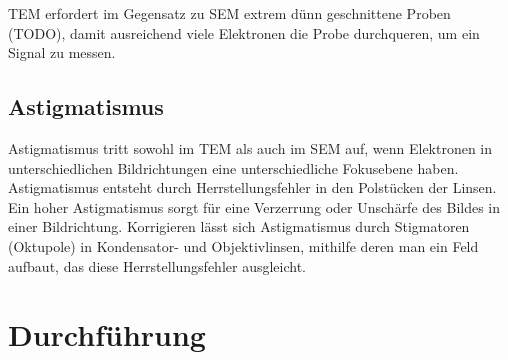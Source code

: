 TEM erfordert im Gegensatz zu SEM extrem dünn geschnittene Proben (TODO), damit ausreichend viele Elektronen die Probe durchqueren, um ein Signal zu messen. %


\subsection{Astigmatismus} %

Astigmatismus tritt sowohl im TEM als auch im SEM auf, wenn Elektronen in unterschiedlichen Bildrichtungen eine unterschiedliche Fokusebene haben.
Astigmatismus entsteht durch Herrstellungsfehler in den Polstücken der Linsen.
Ein hoher Astigmatismus sorgt für eine Verzerrung oder Unschärfe des Bildes in einer Bildrichtung. \cite{MyScope}
Korrigieren lässt sich Astigmatismus durch Stigmatoren (Oktupole) in Kondensator- und Objektivlinsen, mithilfe deren man ein Feld aufbaut, das diese Herrstellungsfehler ausgleicht.

\section{Durchführung}



